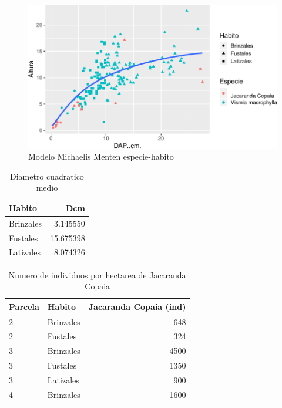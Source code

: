 \documentclass[letterpaper,9pt,twocolumn,twoside,]{pinp}
\begin{document}
\begin{figure}

{\centering \includegraphics{report_ecology_files/figure-latex/unnamed-chunk-7-1} 

}

\caption{Modelo Michaelis Menten especie-habito}\label{fig:unnamed-chunk-7}
\end{figure}

\begin{table}

\caption{\label{tab:unnamed-chunk-8}Diametro cuadratico medio}
\centering
\begin{tabular}[t]{l|r}
\hline
Habito & Dcm\\
\hline
Brinzales & 3.145550\\
\hline
Fustales & 15.675398\\
\hline
Latizales & 8.074326\\
\hline
\end{tabular}
\end{table}

\begin{table}

\caption{\label{tab:unnamed-chunk-10}Numero de individuos por hectarea de Jacaranda Copaia}
\centering
\begin{tabular}[t]{l|l|r}
\hline
Parcela & Habito & Jacaranda Copaia (ind)\\
\hline
2 & Brinzales & 648\\
\hline
2 & Fustales & 324\\
\hline
3 & Brinzales & 4500\\
\hline
3 & Fustales & 1350\\
\hline
3 & Latizales & 900\\
\hline
4 & Brinzales & 1600\\
\hline
\end{tabular}
\end{table}
\end{document}
